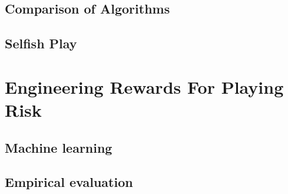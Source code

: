 \documentclass[letterpaper]{article}
\numberwithin{equation}{section}
\numberwithin{theorem}{section}
\numberwithin{lemma}{section}
\numberwithin{df}{section}
\begin{document}

\subsection{Comparison of Algorithms}


\subsection{Selfish Play}


\section{Engineering Rewards For Playing Risk}


\subsection{Machine learning}


\subsection{Empirical evaluation}




\end{document}
